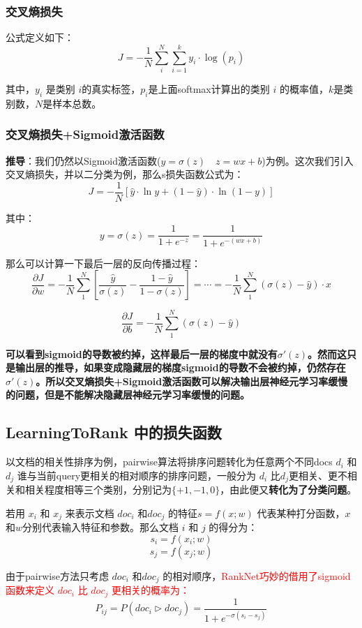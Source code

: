 \documentclass[12pt]{article}
\begin{document}
\subsubsection{交叉熵损失}
公式定义如下：
$$
J = -\frac{1}{N}\sum_i^N\sum_{i=1}^ky_i\cdot\log{(p_i)}
$$

其中，$y_i$ 是类别 $i$的真实标签，$p_i$是上面softmax计算出的类别 $i$ 的概率值，$k$是类别数，$N$是样本总数。

\subsubsection{交叉熵损失+Sigmoid激活函数}
\textbf{推导}：我们仍然以Sigmoid激活函数($y = \sigma(z) \quad z = wx + b$)为例。这次我们引入交叉熵损失，并以二分类为例，那么s损失函数公式为：
$$
J = -\frac{1}{N}[\hat{y}\cdot\ln{y} + (1-\hat{y})\cdot\ln{(1-y)}]
$$

其中：
$$
y = \sigma(z) = \frac{1}{1+e^{-z}} = \frac{1}{1+e^{-(wx+b)}}
$$

那么可以计算一下最后一层的反向传播过程：
$$
\frac{\partial J}{\partial w} = -\frac{1}{N}\sum_1^N[\frac{\hat{y}}{\sigma(z)} - \frac{1-\hat{y}}{1-\sigma(z)}] = \cdots =  -\frac{1}{N}\sum_1^N(\sigma(z)-\hat{y})\cdot x
$$

$$
\frac{\partial J}{\partial b} = -\frac{1}{N}\sum_1^N(\sigma(z)-\hat{y})
$$

\textbf{可以看到sigmoid的导数被约掉，这样最后一层的梯度中就没有$\sigma'(z)$。然而这只是输出层的推导，如果变成隐藏层的梯度sigmoid的导数不会被约掉，仍然存在$\sigma'(z)$。所以交叉熵损失+Sigmoid激活函数可以解决输出层神经元学习率缓慢的问题，但是不能解决隐藏层神经元学习率缓慢的问题。}

\subsection{LearningToRank 中的损失函数\cite{About_RankNet_LambdaRank}}
以文档的相关性排序为例，pairwise算法将排序问题转化为任意两个不同docs $d_i$ 和 $d_j$ 谁与当前query更相关的相对顺序的排序问题，一般分为 $d_i$ 比$d_j$更相关、更不相关和相关程度相等三个类别，分别记为$\{+1, -1, 0\}$，由此便又\textbf{转化为了分类问题}。

若用 $x_i$ 和 $x_j$ 来表示文档 $doc_i$ 和$doc_j$ 的特征$s = f(x;w)$ 代表某种打分函数，$x$和$w$分别代表输入特征和参数。那么文档 $i$ 和 $j$ 的得分为：
$$
s_i = f(x_i;w)
$$
$$
s_j = f(x_j;w)
$$

由于pairwise方法只考虑 $doc_i$ 和$doc_j$ 的相对顺序，\textcolor{red}{RankNet巧妙的借用了sigmoid函数来定义 $doc_i$ 比 $doc_j$ 更相关的概率为：}
$$
P_{ij} = P(doc_i \rhd doc_j) = \frac{1}{1 + e^{-\sigma(s_i - s_j)}}
$$
\end{document}
